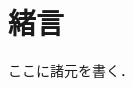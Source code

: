 \documentclass[main]{subfiles}
\begin{document}
\chapter{緒言}
ここに諸元を書く\cite{ref:mnih2013playing}．
\end{document}

